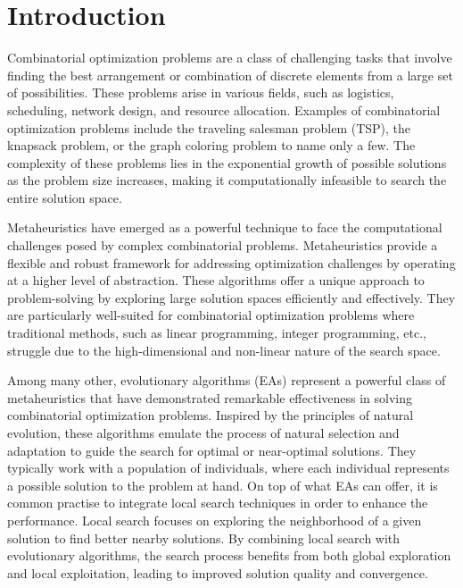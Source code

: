 \documentclass[twoside]{ctuthesis}
\theoremstyle{plain}
\theoremstyle{definition}
\theoremstyle{note}
\begin{document}
	
\maketitle


\chapter{Introduction}


Combinatorial optimization problems are a class of challenging tasks that involve finding the best arrangement or combination of discrete elements from a large set of possibilities. These problems arise in various fields, such as logistics, scheduling, network design, and resource allocation. Examples of combinatorial optimization problems include the traveling salesman problem (TSP), the knapsack problem, or the graph coloring problem to name only a few. The complexity of these problems lies in the exponential growth of possible solutions as the problem size increases, making it computationally infeasible to search the entire solution space.

Metaheuristics have emerged as a powerful technique to face the computational challenges posed by complex combinatorial problems. Metaheuristics provide a flexible and robust framework for addressing optimization challenges by operating at a higher level of abstraction. These algorithms offer a unique approach to problem-solving by exploring large solution spaces efficiently and effectively. They are particularly well-suited for combinatorial optimization problems where traditional methods, such as linear programming, integer programming, etc., struggle due to the high-dimensional and non-linear nature of the search space.

Among many other, evolutionary algorithms (EAs) represent a powerful class of metaheuristics that have demonstrated remarkable effectiveness in solving combinatorial optimization problems. Inspired by the principles of natural evolution, these algorithms emulate the process of natural selection and adaptation to guide the search for optimal or near-optimal solutions. They typically work with a population of individuals, where each individual represents a possible solution to the problem at hand. On top of what EAs can offer, it is common practise to integrate local search techniques in order to enhance the performance. Local search focuses on exploring the neighborhood of a given solution to find better nearby solutions. By combining local search with evolutionary algorithms, the search process benefits from both global exploration and local exploitation, leading to improved solution quality and convergence.
\end{document}
